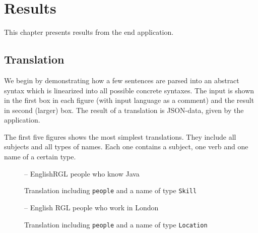 \chapter{Results}\label{ch:results}
This chapter presents results from the end application.

\section{Translation}
We begin by demonstrating how a few sentences are parsed into an abstract syntax which is linearized into all possible concrete syntaxes. The input is shown in the first box in each figure (with input language as a comment) and the result in second (larger) box. The result of a translation is JSON-data, given by the application.

The first five figures shows the most simplest translations. They include all subjects and all types of names. Each one contains a subject, one verb and one name of a certain type.

\begin{figure}[H]
\begin{terminal}
-- EnglishRGL
people who know Java
\end{terminal}
\begin{json-small}
\end{json-small}
\caption{Translation including \texttt{people} and a name of type \texttt{Skill}\label{fig:asts-depths}}
\end{figure}

\begin{figure}[H]
\begin{terminal}
-- English RGL
people who work in London
\end{terminal}
\begin{json-small}
\end{json-small}
\caption{Translation including \texttt{people} and a name of type \texttt{Location}\label{fig:asts-depths}}
\end{figure}

